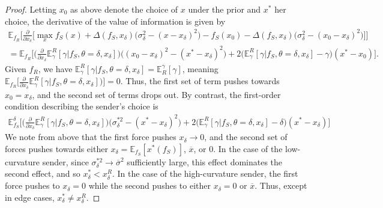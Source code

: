 \documentclass[11pt,dvipsnames]{article}
\begin{document}
\begin{appendix}
\samplingspot*

\begin{proof}
Letting $x_0$ as above denote the choice of $x$ under the prior and $x^*$ her choice, the derivative of the value of information is given by
\begin{align*}
\mathbb{E}_{f_R}\bigg[\frac{\partial}{\partial x_\delta}
\bigg[\max_x f_S(x) + \Delta(f_S,x_\delta)\big(\sigma_\delta^2-(x-x_\delta)^2\big) - f_S(x_0) - \Delta(f_S,x_\delta)\big(\sigma_\delta^2-(x_0-x_\delta)^2\big)	\bigg]\bigg]
\\
= 
\mathbb{E}_{f_R}\bigg[\big(\frac{\partial}{\partial x_\delta} \mathbb{E}_\gamma^R[\gamma|f_S,\theta=\delta,x_\delta]\big)\big((x_0-x_\delta)^2-(x^*-x_\delta)^2\big)
+2\big(\mathbb{E}_\gamma^R[\gamma|f_S,\theta=\delta,x_\delta]-\gamma\big)(x^*-x_0)
\bigg].
\end{align*}
Given $f_R$, we have $\mathbb{E}_\gamma^R[\gamma|f_S,\theta=\delta,x_\delta] = \mathbb{E}_R^\gamma[\gamma]$, meaning $\mathbb{E}_{f_R}\big[\frac{\partial}{\partial x_\delta} \mathbb{E}_\gamma^R[\gamma|f_S,\theta=\delta,x_\delta]\big)\big]=0$.
Thus, the first set of term pushes towards $x_0=x_\delta$, and the second set of terms drops out.
By contrast, the first-order condition describing the sender's choice is
\begin{align*}
\mathbb{E}_{f_S}^\delta
\bigg[
\big(\frac{\partial}{\partial x_\delta} \mathbb{E}_\gamma^R[\gamma|f_S,\theta=\delta,x_\delta]\big)\big(\sigma_\delta^{*2}-(x^*-x_\delta)^2\big)
+2 \big(\mathbb{E}_\gamma^R[\gamma|f_S,\theta=\delta,x_\delta]-\delta\big)(x^*-x_\delta)\bigg]
\end{align*}
We note from above that the first force pushes $x_\delta \to 0$, and the second set of forces pushes towards either $x_\delta = \mathbb{E}_{f_S}[x^*(f_S)]$, $\overline{x}$, or $0$.
In the case of the low-curvature sender, since $\sigma_\delta^{*2} \to \overline{\sigma}^2$ sufficiently large, this effect dominates the second effect, and so $x_\delta^*<x_\delta^R$.
In the case of the high-curvature sender, the first force pushes to $x_\delta = 0$ while the second pushes to either $x_\delta = 0$ or $\overline{x}$.
Thus, except in edge cases, $x_\delta^* \neq x_\delta^R$.
\end{proof}


\end{appendix}
\end{document}
